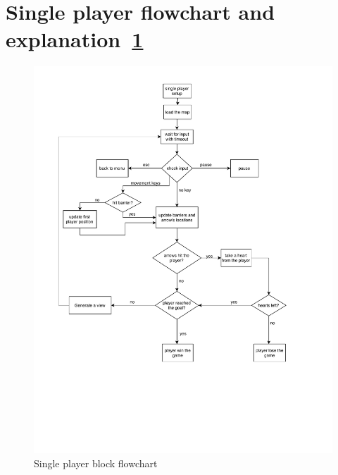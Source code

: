 \section{Single player flowchart and explanation~\ref{fig:singleplayer}}

\begin{figure}
    \centering 
    \includegraphics[width=\columnwidth]{singleplayer.pdf}
    \caption{Single player block flowchart }
    \label{fig:singleplayer}
\end{figure}

